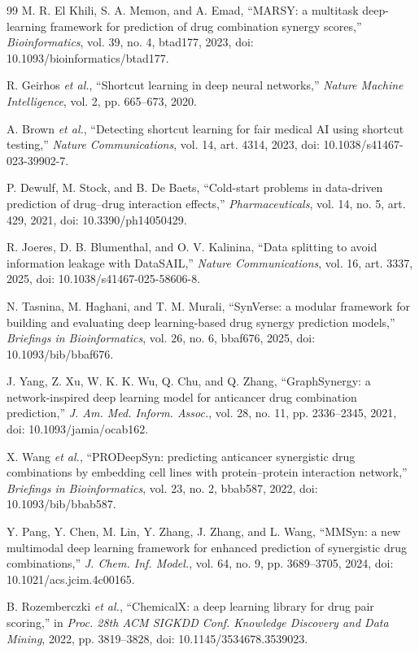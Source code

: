 \documentclass[conference]{IEEEtran}
\begin{document}
\begin{thebibliography}{99}
M. R. El Khili, S. A. Memon, and A. Emad, ``MARSY: a multitask deep-learning framework for prediction of drug combination synergy scores,'' \emph{Bioinformatics}, vol. 39, no. 4, btad177, 2023, doi: 10.1093/bioinformatics/btad177.

R. Geirhos \emph{et al.}, ``Shortcut learning in deep neural networks,'' \emph{Nature Machine Intelligence}, vol. 2, pp. 665--673, 2020.

A. Brown \emph{et al.}, ``Detecting shortcut learning for fair medical AI using shortcut testing,'' \emph{Nature Communications}, vol. 14, art. 4314, 2023, doi: 10.1038/s41467-023-39902-7.

P. Dewulf, M. Stock, and B. De Baets, ``Cold-start problems in data-driven prediction of drug--drug interaction effects,'' \emph{Pharmaceuticals}, vol. 14, no. 5, art. 429, 2021, doi: 10.3390/ph14050429.

R. Joeres, D. B. Blumenthal, and O. V. Kalinina, ``Data splitting to avoid information leakage with DataSAIL,'' \emph{Nature Communications}, vol. 16, art. 3337, 2025, doi: 10.1038/s41467-025-58606-8.

N. Tasnina, M. Haghani, and T. M. Murali, ``SynVerse: a modular framework for building and evaluating deep learning-based drug synergy prediction models,'' \emph{Briefings in Bioinformatics}, vol. 26, no. 6, bbaf676, 2025, doi: 10.1093/bib/bbaf676.

J. Yang, Z. Xu, W. K. K. Wu, Q. Chu, and Q. Zhang, ``GraphSynergy: a network-inspired deep learning model for anticancer drug combination prediction,'' \emph{J. Am. Med. Inform. Assoc.}, vol. 28, no. 11, pp. 2336--2345, 2021, doi: 10.1093/jamia/ocab162.

X. Wang \emph{et al.}, ``PRODeepSyn: predicting anticancer synergistic drug combinations by embedding cell lines with protein--protein interaction network,'' \emph{Briefings in Bioinformatics}, vol. 23, no. 2, bbab587, 2022, doi: 10.1093/bib/bbab587.

Y. Pang, Y. Chen, M. Lin, Y. Zhang, J. Zhang, and L. Wang, ``MMSyn: a new multimodal deep learning framework for enhanced prediction of synergistic drug combinations,'' \emph{J. Chem. Inf. Model.}, vol. 64, no. 9, pp. 3689--3705, 2024, doi: 10.1021/acs.jcim.4c00165.

B. Rozemberczki \emph{et al.}, ``ChemicalX: a deep learning library for drug pair scoring,'' in \emph{Proc. 28th ACM SIGKDD Conf. Knowledge Discovery and Data Mining}, 2022, pp. 3819--3828, doi: 10.1145/3534678.3539023.


\end{thebibliography}
\end{document}

